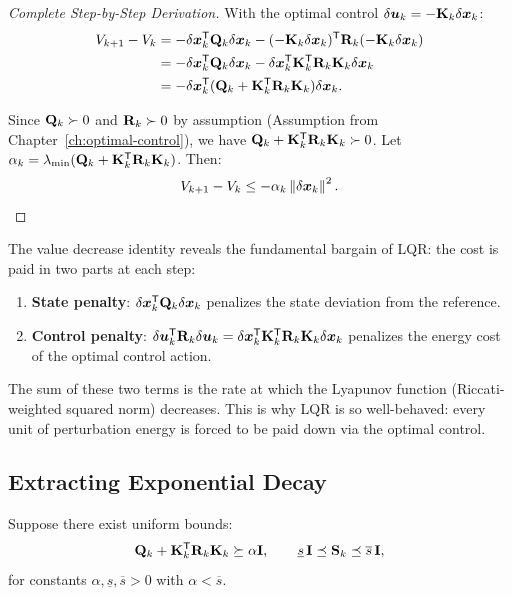 \begin{proof}[Complete Step-by-Step Derivation]
With the optimal control $\delta\bm{u}_k = -\mathbf{K}_k\delta\bm{x}_k$:
\begin{align}
V_{k+1} - V_k &= -\delta\bm{x}_k^{\mathsf{T}}\mathbf{Q}_k\delta\bm{x}_k - (-\mathbf{K}_k\delta\bm{x}_k)^{\mathsf{T}}\mathbf{R}_k(-\mathbf{K}_k\delta\bm{x}_k) \notag\\
&= -\delta\bm{x}_k^{\mathsf{T}}\mathbf{Q}_k\delta\bm{x}_k - \delta\bm{x}_k^{\mathsf{T}}\mathbf{K}_k^{\mathsf{T}}\mathbf{R}_k\mathbf{K}_k\delta\bm{x}_k \\
&= -\delta\bm{x}_k^{\mathsf{T}}(\mathbf{Q}_k + \mathbf{K}_k^{\mathsf{T}}\mathbf{R}_k\mathbf{K}_k)\delta\bm{x}_k.
\label{eq:ch6:value-drop-final}
\end{align}

Since $\mathbf{Q}_k \succ 0$ and $\mathbf{R}_k \succ 0$ by assumption (Assumption from Chapter~\ref{ch:optimal-control}),
we have $\mathbf{Q}_k + \mathbf{K}_k^{\mathsf{T}}\mathbf{R}_k\mathbf{K}_k \succ 0$. Let $\alpha_k = \lambda_{\min}(\mathbf{Q}_k + \mathbf{K}_k^{\mathsf{T}}\mathbf{R}_k\mathbf{K}_k)$.
Then:
\begin{equation}
V_{k+1} - V_k \leq -\alpha_k \left\lVert \delta\bm{x}_k \right\rVert^2.
\label{eq:ch6:value-drop-alpha}
\end{equation}
\end{proof}

\begin{remark}[Interpretation]
The value decrease identity reveals the fundamental bargain of LQR: the cost is paid in two parts at each step:
\begin{enumerate}
\item \textbf{State penalty}: $\delta\bm{x}_k^{\mathsf{T}}\mathbf{Q}_k\delta\bm{x}_k$ penalizes the state deviation from the reference.
\item \textbf{Control penalty}: $\delta\bm{u}_k^{\mathsf{T}}\mathbf{R}_k\delta\bm{u}_k = \delta\bm{x}_k^{\mathsf{T}}\mathbf{K}_k^{\mathsf{T}}\mathbf{R}_k\mathbf{K}_k\delta\bm{x}_k$ penalizes the energy cost of the optimal control action.
\end{enumerate}

The sum of these two terms is the rate at which the Lyapunov function (Riccati-weighted squared norm) decreases.
This is why LQR is so well-behaved: every unit of perturbation energy is forced to be paid down via the optimal control.
\end{remark}

\subsection{Extracting Exponential Decay}

Suppose there exist uniform bounds:
\begin{equation}
\mathbf{Q}_k + \mathbf{K}_k^{\mathsf{T}}\mathbf{R}_k\mathbf{K}_k \succeq \alpha\mathbf{I},
\qquad
\underline{s}\,\mathbf{I} \preceq \mathbf{S}_k \preceq \overline{s}\,\mathbf{I},
\label{eq:ch6:bounds}
\end{equation}
for constants $\alpha, \underline{s}, \overline{s} > 0$ with $\alpha < \overline{s}$.

